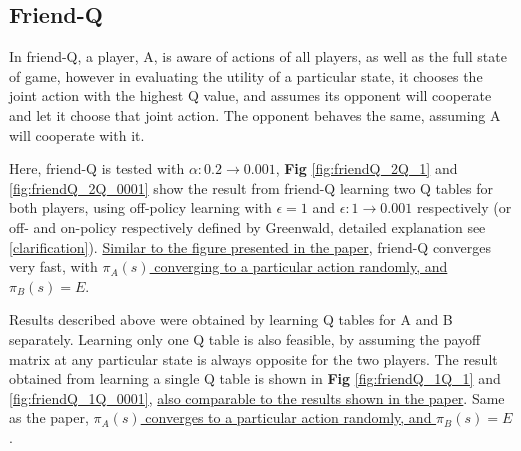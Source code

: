 \documentclass[10pt]{article}
\begin{document}



\subsection{Friend-Q} \label{friendQ}
In friend-Q\cite{LittmanFriendorFoeQlearningGeneralSum2001, GreenwaldCorrelatedQLearning2003, GreenwaldCorrelatedQLearning2005}, a player, A, is aware of actions of all players, as well as the full state of game, however in evaluating the utility of a particular state, it chooses the joint action with the highest Q value, and assumes its opponent will cooperate and let it choose that joint action. The opponent behaves the same, assuming A will cooperate with it.\par

Here, friend-Q is tested with $\alpha:0.2\rightarrow0.001$, \textbf{Fig} \ref{fig:friendQ_2Q_1} and \ref{fig:friendQ_2Q_0001} show the result from friend-Q learning two Q tables for both players, using off-policy learning with $\epsilon=1$ and $\epsilon:1\rightarrow0.001$ respectively (or off- and on-policy respectively defined by Greenwald\cite{GreenwaldCorrelatedQLearning2005}, detailed explanation see \ref{clarification}). \ul{Similar to the figure presented in the paper}\cite{GreenwaldCorrelatedQLearning2003}, friend-Q converges very fast, with \ul{$\pi_A(s)$ converging to a particular action randomly, and $\pi_B(s)=E$}.\par
Results described above were obtained by learning Q tables for A and B separately. Learning only one Q table is also feasible, by assuming the payoff matrix at any particular state is always opposite for the two players. The result obtained from learning a single Q table is shown in \textbf{Fig} \ref{fig:friendQ_1Q_1} and \ref{fig:friendQ_1Q_0001}, \ul{also comparable to the results shown in the paper}\cite{GreenwaldCorrelatedQLearning2003}. Same as the paper, \ul{$\pi_A(s)$ converges to a particular action randomly, and $\pi_B(s)=E$}.
\end{document}
